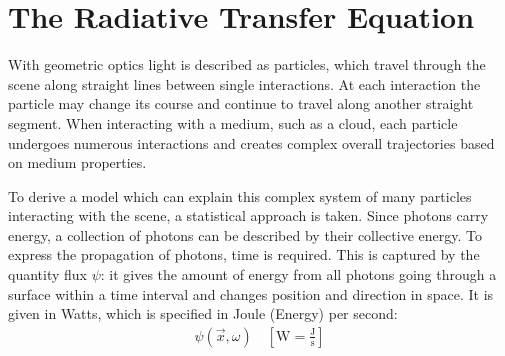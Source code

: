 \section{The Radiative Transfer Equation}

With geometric optics light is described as particles, which travel through the scene along straight lines between single interactions. At each interaction the particle may change its course and continue to travel along another straight segment. When interacting with a medium, such as a cloud, each particle undergoes numerous interactions and creates complex overall trajectories based on medium properties.

To derive a model which can explain this complex system of many particles interacting with the scene, a statistical approach is taken. Since photons carry energy, a collection of photons can be described by their collective energy. To express the propagation of photons, time is required. This is captured by the quantity flux $\psi$: it gives the amount of energy from all photons going through a surface within a time interval and changes position and direction in space. It is given in Watts, which is specified in Joule (Energy) per second:
\begin{align*}
\psi\left(\vec{x}, \omega\right)
\quad
\left[\si{\watt} = \frac{\si{\joule}}{\si{\second}}\right]
\end{align*}

